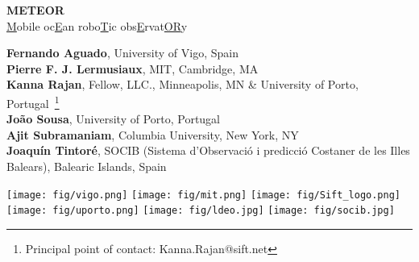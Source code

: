 \begin{titlepage}

  \begin{center}

    
    \Large{\textbf{METEOR}\\
      \underline{M}obile oc\underline{E}an robo\underline{T}ic obs\underline{E}rvat\underline{OR}y}

  \vspace{+5in}
  \large
  \textbf{Fernando Aguado}, University of Vigo, Spain\\
  \textbf{Pierre F. J. Lermusiaux}, MIT, Cambridge, MA\\
  \textbf{Kanna Rajan}, Fellow, \org LLC., Minneapolis, MN \& University of Porto, Portugal~\footnote{Principal point of
    contact: Kanna.Rajan@sift.net}\\
  \textbf{Jo\~ao Sousa}, University of Porto, Portugal\\
  \textbf{Ajit Subramaniam}, Columbia University, New York, NY\\
  \textbf{Joaqu\'{i}n Tintor\'{e}}, SOCIB (Sistema d’Observaci\'{o} i predicci\'{o} Costaner de les Illes Balears), Balearic Islands, Spain\\
  \vspace{+0.2in}


\texttt{[image: fig/vigo.png]}
\hspace{+0.6cm}\texttt{[image: fig/mit.png]}
\hspace{+0.6cm}\texttt{[image: fig/Sift\_logo.png]}
\hspace{+0.6cm}\texttt{[image: fig/uporto.png]}
\hspace{+0.6cm}\texttt{[image: fig/ldeo.jpg]}
\hspace{+0.6cm}\texttt{[image: fig/socib.jpg]}\\
\end{center}
\end{titlepage}


